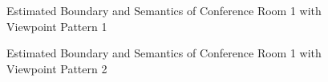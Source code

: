\documentclass[11pt, a4paper,oneside,chapterprefix=false]{scrbook}
\begin{document}
\begin{figure}[H]
    \centering
      \label{fig:conf1 b 200 0} \hfill
     \label{fig:conf1 s 200 0}
    \caption{Estimated Boundary and Semantics of Conference Room 1 with Viewpoint Pattern 1}
    \label{fig:conf1 0}
\end{figure}

\vspace{75pt}

\begin{figure}[H]
    \centering
      \label{fig:conf1 b 200 4} \hfill
     \label{fig:conf1 s 200 4}
    \caption{Estimated Boundary and Semantics of Conference Room 1 with Viewpoint Pattern 2}
    \label{fig:conf1 4}
\end{figure}
\end{document}
